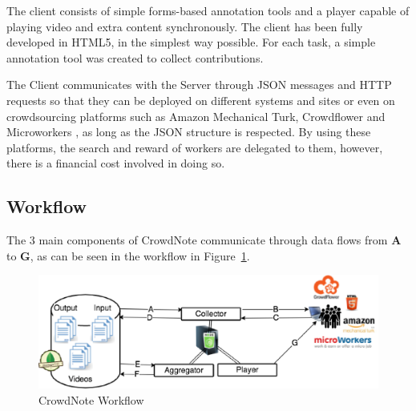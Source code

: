 The client consists of simple forms-based annotation tools and a player capable of playing video and extra content synchronously. The client has been fully developed in HTML5, in the simplest way possible. For each task, a simple annotation tool was created to collect contributions.

The Client communicates with the Server through JSON messages and HTTP requests so that they can be deployed on different systems and sites or even on crowdsourcing platforms such as Amazon Mechanical Turk, Crowdflower and Microworkers \cite{Difallah:2015:DMC:2736277.2741685}, as long as the JSON structure is respected. By using these platforms, the search and reward of workers are delegated to them, however, there is a financial cost involved in doing so.






\subsection{Workflow}

The 3 main components of CrowdNote communicate through data flows from \textbf{A} to \textbf{G}, as can be seen in the workflow in Figure~\ref{workflow}.


\begin{figure}[h]
	\centerline{\includegraphics[scale=0.33] {figure/Workflow}}
	\caption{CrowdNote Workflow}
	\label{workflow}
\end{figure}

